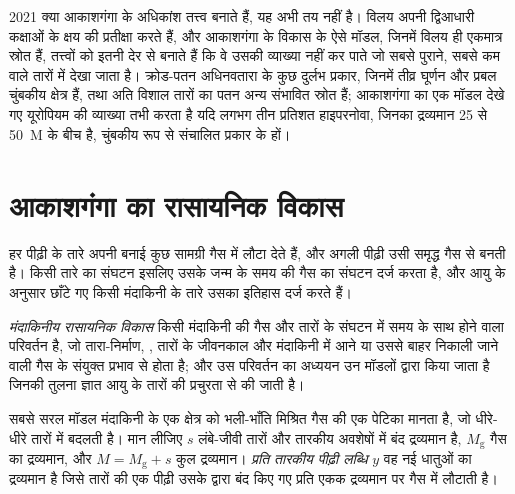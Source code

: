 \begin{dated}{2021}
क्या  आकाशगंगा के अधिकांश 
तत्त्व बनाते हैं, यह अभी तय नहीं है। विलय अपनी द्विआधारी कक्षाओं के क्षय की
प्रतीक्षा करते हैं, और आकाशगंगा के विकास के ऐसे मॉडल, जिनमें विलय ही एकमात्र स्रोत हैं,
 तत्त्वों को इतनी देर से बनाते हैं कि वे उसकी व्याख्या नहीं कर पाते
जो सबसे पुराने, सबसे कम  वाले तारों में देखा जाता है। क्रोड-पतन अधिनवतारा के कुछ दुर्लभ प्रकार,
जिनमें तीव्र घूर्णन और प्रबल चुंबकीय क्षेत्र हैं, तथा अति विशाल तारों का पतन
अन्य संभावित स्रोत हैं; आकाशगंगा का एक मॉडल देखे गए यूरोपियम की व्याख्या
तभी करता है यदि लगभग तीन प्रतिशत हाइपरनोवा, जिनका द्रव्यमान
25 से \qty{50}{M_\odot} के बीच है, चुंबकीय रूप से
संचालित प्रकार के हों।
\end{dated}

\section{आकाशगंगा का रासायनिक विकास}\label{sec:b3:origin-of-elements:gce}

हर पीढ़ी के तारे अपनी बनाई कुछ सामग्री गैस में लौटा देते हैं, और
अगली पीढ़ी उसी समृद्ध गैस से बनती है। किसी तारे का संघटन
इसलिए उसके जन्म के समय की गैस का संघटन दर्ज करता है, और
आयु के अनुसार छाँटे गए किसी मंदाकिनी के तारे उसका इतिहास दर्ज करते हैं।

\begin{definition}[मंदाकिनीय रासायनिक विकास]\label{def:b3:origin-of-elements:gce}
\emph{मंदाकिनीय रासायनिक विकास}
किसी मंदाकिनी की गैस और तारों के संघटन में समय के साथ होने वाला परिवर्तन है, जो
तारा-निर्माण, , तारों के जीवनकाल और मंदाकिनी में आने
या उससे बाहर निकाली जाने वाली गैस के संयुक्त प्रभाव से होता है;
और उस परिवर्तन का अध्ययन उन मॉडलों द्वारा किया जाता है
जिनकी तुलना ज्ञात आयु के तारों की प्रचुरता से की जाती है।
\end{definition}

सबसे सरल मॉडल मंदाकिनी के एक क्षेत्र को भली-भाँति मिश्रित गैस की एक पेटिका मानता है,
जो धीरे-धीरे तारों में बदलती है। मान लीजिए $s$ लंबे-जीवी तारों और तारकीय अवशेषों में
बंद द्रव्यमान है, $M_\mathrm{g}$ गैस का द्रव्यमान, और
$M = M_\mathrm{g} + s$ कुल द्रव्यमान। \emph{प्रति तारकीय
पीढ़ी लब्धि} $y$ वह नई धातुओं का द्रव्यमान है जिसे तारों की एक पीढ़ी
उसके द्वारा बंद किए गए प्रति एकक द्रव्यमान पर गैस में लौटाती है।

